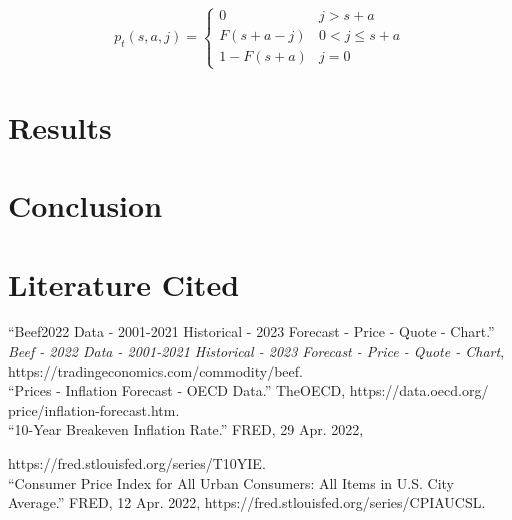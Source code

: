 \documentclass[12pt,a4paper]{article}
\begin{document}
\begin{equation} \label{3}
p_{t}(s,a,j) = \begin{cases} 0 & j > s + a \\ F(s + a - j) & 0 < j \leq s + a \\ 1 - F(s + a) & j = 0 \end{cases}
\end{equation}

\section{Results}

\section{Conclusion}

\newpage

\section{Literature Cited}

“Beef2022 Data - 2001-2021 Historical - 2023 Forecast - Price - Quote - Chart.” 
\textit{Beef - 2022 Data - 2001-2021 Historical - 2023 Forecast - Price - Quote - Chart}, https://tradingeconomics.com/commodity/beef. 
\\

“Prices - Inflation Forecast - OECD Data.” TheOECD,
https://data.oecd.org/
price/inflation-forecast.htm. 
\\

“10-Year Breakeven Inflation Rate.” FRED, 29 Apr. 2022, 

https://fred.stlouisfed.org/series/T10YIE. 
\\

“Consumer Price Index for All Urban Consumers: All Items in U.S. City Average.” FRED, 12 Apr. 2022, https://fred.stlouisfed.org/series/CPIAUCSL. 
\end{document}
